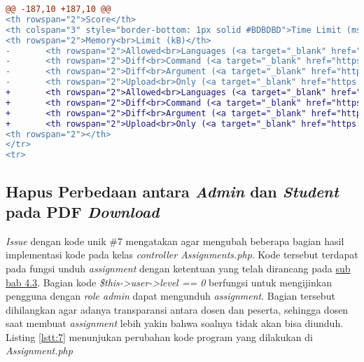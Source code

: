 \begin{lstlisting}[language=diff, caption=Perubahan kode program pada halaman \textit{add\_assignment.twig}, label=lstt:6, basicstyle=\ttfamily, frame=single, columns=fullflexible, keepspaces=true, breaklines=true]
@@ -187,10 +187,10 @@
<th rowspan="2">Score</th>
<th colspan="3" style="border-bottom: 1px solid #BDBDBD">Time Limit (ms)</th>
<th rowspan="2">Memory<br>Limit (kB)</th>
-       <th rowspan="2">Allowed<br>Languages (<a target="_blank" href="https://github.com/mjnaderi/Sharif-Judge/blob/docs/v1.4/add_assignment.md#allowed-languages">?</a>)</th>
-       <th rowspan="2">Diff<br>Command (<a target="_blank" href="https://github.com/mjnaderi/Sharif-Judge/blob/docs/v1.4/add_assignment.md#diff-command">?</a>)</th>
-       <th rowspan="2">Diff<br>Argument (<a target="_blank" href="https://github.com/mjnaderi/Sharif-Judge/blob/docs/v1.4/add_assignment.md#diff-arguments">?</a>)</th>
-       <th rowspan="2">Upload<br>Only (<a target="_blank" href="https://github.com/mjnaderi/Sharif-Judge/blob/docs/v1.4/add_assignment.md#upload-only">?</a>)</th>
+       <th rowspan="2">Allowed<br>Languages (<a target="_blank" href="https://github.com/ftisunpar/Sharif-Judge/blob/docs/v1.4/add_assignment.md#allowed-languages">?</a>)</th>
+       <th rowspan="2">Diff<br>Command (<a target="_blank" href="https://github.com/ftisunpar/Sharif-Judge/blob/docs/v1.4/add_assignment.md#diff-command">?</a>)</th>
+       <th rowspan="2">Diff<br>Argument (<a target="_blank" href="https://github.com/ftisunpar/Sharif-Judge/blob/docs/v1.4/add_assignment.md#diff-arguments">?</a>)</th>
+       <th rowspan="2">Upload<br>Only (<a target="_blank" href="https://github.com/ftisunpar/Sharif-Judge/blob/docs/v1.4/add_assignment.md#upload-only">?</a>)</th>
<th rowspan="2"></th>
</tr>
<tr>
\end{lstlisting}

	\subsection{Hapus Perbedaan antara \textit{Admin} dan \textit{Student} pada PDF \textit{Download}}
	\textit{Issue} dengan kode unik \#7 mengatakan agar mengubah beberapa bagian hasil implementasi kode pada kelas \textit{controller Assignments.php}. Kode tersebut terdapat pada fungsi unduh \textit{assignment} dengan ketentuan yang telah dirancang pada \hyperref[chap:batassoal]{sub bab 4.3}. Bagian kode \textit{\$this->user->level == 0} berfungsi untuk mengijinkan pengguna dengan \textit{role admin} dapat mengunduh \textit{assignment}. Bagian tersebut dihilangkan agar adanya transparansi antara dosen dan peserta, sehingga dosen saat membuat \textit{assignment} lebih yakin bahwa soalnya tidak akan bisa diunduh. Listing \ref{lstt:7} menunjukan perubahan kode program yang dilakukan di \textit{Assignment.php}
	
